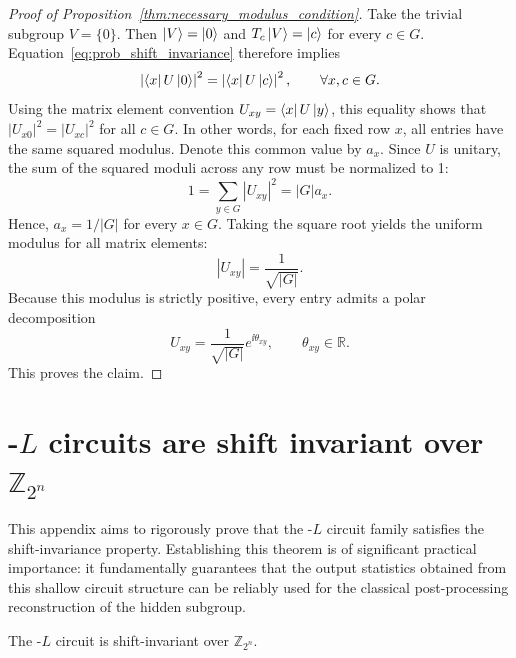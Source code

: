 \begin{proof}[Proof of Proposition~\ref{thm:necessary_modulus_condition}]
    Take the trivial subgroup $V=\{0\}$.
    Then $\ket{V}=\ket{0}$ and $T_c\ket{V}=\ket{c}$ for every $c\in G$.
    Equation~\eqref{eq:prob_shift_invariance} therefore implies
    \begin{equation}
        \left|\bra{x}U\ket{0}\right|^2
        =
        \left|\bra{x}U\ket{c}\right|^2,
        \qquad
        \forall x,c\in G.
    \end{equation}
    Using the matrix element convention $U_{xy}=\bra{x}U\ket{y}$, this equality shows that $|U_{x0}|^2 = |U_{xc}|^2$ for all $c \in G$.
    In other words, for each fixed row $x$, all entries have the same squared modulus.
    Denote this common value by $a_x$.
    Since $U$ is unitary, the sum of the squared moduli across any row must be normalized to 1:
    \begin{equation}
        1=\sum_{y\in G}|U_{xy}|^2=|G|  a_x.
    \end{equation}
    Hence, $a_x=1/|G|$ for every $x\in G$.
    Taking the square root yields the uniform modulus for all matrix elements:
    \begin{equation}
        |U_{xy}|=\frac{1}{\sqrt{|G|}}.
    \end{equation}
    Because this modulus is strictly positive, every entry admits a polar decomposition
    \begin{equation}
        U_{xy}=\frac{1}{\sqrt{|G|}}e^{\ii\theta_{xy}},
        \qquad \theta_{xy}\in\mathbb{R}.
    \end{equation}
    This proves the claim.
\end{proof}

\section{\myqc-$L$ circuits are shift invariant over $\mathbb{Z}_{2^{n}}$}
\label{app:HPk are sinv}
 This appendix aims to rigorously prove that the \myqc-$L$ circuit family satisfies the shift-invariance property. Establishing this theorem is of significant practical importance: it fundamentally guarantees that the output statistics obtained from this shallow circuit structure can be reliably used for the classical post-processing reconstruction of the hidden subgroup.

\begin{restatedtheorem}
The \myqc-$L$ circuit is shift-invariant over $\mathbb{Z}_{2^n}$.
\end{restatedtheorem}

